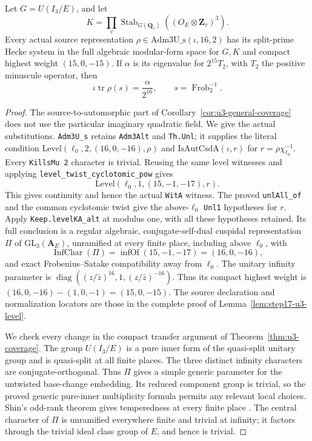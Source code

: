 \begin{lemma}\label{lem:minus7-u3-coverage}
Let \(G=U(I_3/E)\), and let
\[
 K=\prod_v\operatorname{Stab}_{G(\mathbf Q_v)}
       ((O_E\otimes\mathbf Z_v)^3).
\]
Every actual source representation
\(\rho\in\mathrm{Adm3U\_s}(\iota,16,2)\) has its split-prime Hecke
system in the full algebraic modular-form space for \(G,K\) and
compact highest weight \((15,0,-15)\).
If \(\alpha\) is its eigenvalue for \(2^{15}T_2\), with \(T_2\) the
positive minuscule operator, then
\[
 \iota\operatorname{tr}\rho(s)=\frac{\alpha}{2^{16}},
 \qquad s=\operatorname{Frob}_2^{-1}.
 \tag{S7.1}
\]
\end{lemma}

\begin{proof}
The source-to-automorphic part of
Corollary~\ref{cor:u3-general-coverage} does not use the particular
imaginary quadratic field. We give the actual substitutions.
\texttt{Adm3U\_s} retains \texttt{Adm3Alt} and \texttt{Th.Unl};
it supplies the literal condition
\(\mathrm{Level}(\ell_0,2,(16,0,-16),\rho)\) and
\(\mathrm{IsAutCsdA}(\iota,r)\) for \(r=\rho\chi_{\ell_0}^{-1}\).
Every \texttt{KillsMu 2} character is trivial. Reusing the same level
witnesses and applying \texttt{level\_twist\_cyclotomic\_pow} gives
\[
 \mathrm{Level}(\ell_0,1,(15,-1,-17),r).
 \tag{S7.2}
\]
This gives continuity and hence the actual \texttt{WitA} witness.
The proved \texttt{unlAll\_of} and the common cyclotomic twist give
the above-\(\ell_0\) \texttt{Unl1} hypotheses for \(r\).
Apply \texttt{Keep.levelKA\_alt} at modulus one, with all these
hypotheses retained. Its full conclusion is a regular algebraic,
conjugate-self-dual cuspidal representation \(\Pi\) of
\(\mathrm{GL}_3(\mathbf A_E)\), unramified at every finite place,
including above \(\ell_0\), with
\[
 \operatorname{InfChar}(\Pi)=\operatorname{infOf}(15,-1,-17)
 =(16,0,-16),
\]
and exact Frobenius--Satake compatibility away from \(\ell_0\).
The unitary infinity parameter is
\(\operatorname{diag}((z/\bar z)^{16},1,(z/\bar z)^{-16})\).
Thus its compact highest weight is
\((16,0,-16)-(1,0,-1)=(15,0,-15)\).
The source declaration and normalization locators are those in the
complete proof of Lemma~\ref{lem:step17-u3-level}.

We check every change in the compact transfer argument of
Theorem~\ref{thm:u3-coverage}. The group \(U(I_3/E)\) is a pure inner
form of the quasi-split unitary group and is quasi-split at all finite
places. The three distinct infinity characters are
conjugate-orthogonal. Thus \(\Pi\) gives a simple generic parameter
for the untwisted base-change embedding. Its reduced component group
is trivial, so the proved generic pure-inner multiplicity formula
\cite[Theorem~5.0.5, p.~206; \S1.3.4--1.3.5, pp.~69--70]{K17KMSW2014}
permits any relevant local choices. Shin's odd-rank theorem gives
temperedness at every finite place
\cite[Theorem~1.2 and Corollary~1.3, pp.~1647--1648;
Corollary~7.9, p.~1728]{K17Shin2011}.
The central character of \(\Pi\) is unramified everywhere finite and
trivial at infinity; it factors through the trivial ideal class group
of \(E\), and hence is trivial.


\end{proof}
